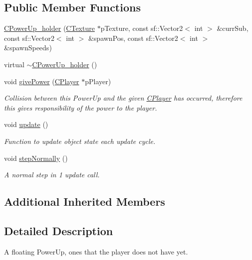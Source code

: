 \subsection*{Public Member Functions}
\begin{DoxyCompactItemize}
\item 
\hyperlink{classCPowerUp__holder_ab7c2b4530e8f7ebffcdafd5fcc4b2c95}{C\-Power\-Up\-\_\-holder} (\hyperlink{classCTexture}{C\-Texture} $\ast$p\-Texture, const sf\-::\-Vector2$<$ int $>$ \&curr\-Sub, const sf\-::\-Vector2$<$ int $>$ \&spawn\-Pos, const sf\-::\-Vector2$<$ int $>$ \&spawn\-Speeds)
\item 
virtual \hyperlink{classCPowerUp__holder_a41dab90c6479557756af37483fd19232}{$\sim$\-C\-Power\-Up\-\_\-holder} ()
\item 
void \hyperlink{classCPowerUp__holder_a4af6d4a8e15ab5e00053c94c5f328873}{give\-Power} (\hyperlink{classCPlayer}{C\-Player} $\ast$p\-Player)
\begin{DoxyCompactList}\small\item\em Collision between this Power\-Up and the given \hyperlink{classCPlayer}{C\-Player} has occurred, therefore this gives responsibility of the power to the player. \end{DoxyCompactList}\item 
void \hyperlink{classCPowerUp__holder_a328fb121f8134feaa10db9db7bd3838b}{update} ()
\begin{DoxyCompactList}\small\item\em Function to update object state each update cycle. \end{DoxyCompactList}\item 
void \hyperlink{classCPowerUp__holder_a7897ad82d7276328c71409d9ecc27cd8}{step\-Normally} ()
\begin{DoxyCompactList}\small\item\em A normal step in 1 update call. \end{DoxyCompactList}\end{DoxyCompactItemize}
\subsection*{Additional Inherited Members}


\subsection{Detailed Description}
A floating Power\-Up, ones that the player does not have yet. 

